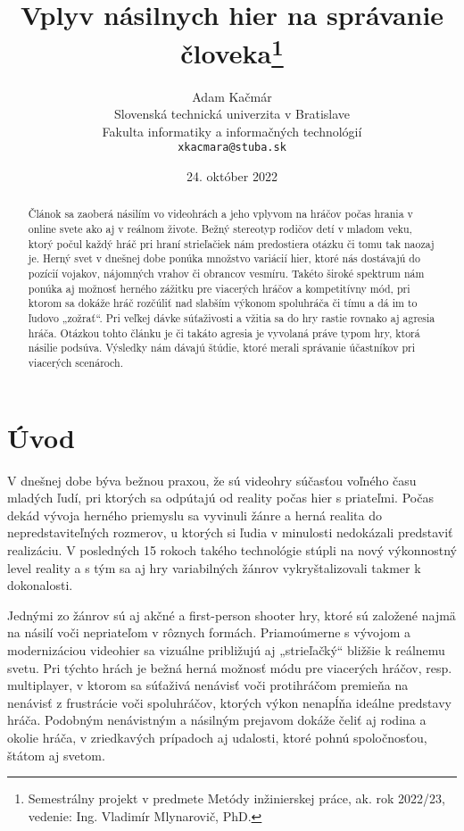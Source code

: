 \documentclass[10pt,twoside,slovak,a4paper]{article}
\title{Vplyv násilnych hier na správanie človeka\thanks{Semestrálny projekt v predmete Metódy inžinierskej práce, ak. rok 2022/23, vedenie: Ing. Vladimír Mlynarovič, PhD.}} %
\author{Adam Kačmár\\[2pt]
	{\small Slovenská technická univerzita v Bratislave}\\
	{\small Fakulta informatiky a informačných technológií}\\
	{\small \texttt{xkacmara@stuba.sk}}
	}
\date{\small 24. október 2022} %
\begin{document}
\maketitle

\begin{abstract}
Článok sa zaoberá násilím vo videohrách a jeho vplyvom na hráčov počas hrania v online svete ako aj v reálnom živote. Bežný stereotyp rodičov detí v mladom veku, ktorý počul každý hráč pri hraní strieľačiek nám predostiera otázku či tomu tak naozaj je. Herný svet v dnešnej dobe ponúka množstvo variácií hier, ktoré nás dostávajú do pozícií vojakov, nájomných vrahov či obrancov vesmíru. Takéto široké spektrum nám ponúka aj možnosť herného zážitku pre viacerých hráčov a kompetitívny mód, pri ktorom sa dokáže hráč rozčúliť nad slabším výkonom spoluhráča či tímu a dá im to ľudovo „zožrať“. Pri veľkej dávke súťaživosti a vžitia sa do hry rastie rovnako aj agresia hráča. Otázkou tohto článku je či takáto agresia je vyvolaná práve typom hry, ktorá násilie podsúva. Výsledky nám dávajú štúdie, ktoré merali správanie účastníkov pri viacerých scenároch.
\end{abstract}



\section{Úvod}

V dnešnej dobe býva bežnou praxou, že sú videohry súčasťou voľného času mladých ľudí, pri ktorých sa odpútajú od reality počas hier s priateľmi. Počas dekád vývoja herného priemyslu sa vyvinuli žánre a herná realita do nepredstaviteľných rozmerov, u ktorých si ľudia v minulosti nedokázali predstaviť realizáciu. V posledných 15 rokoch takého technológie stúpli na nový výkonnostný level reality a s tým sa aj hry variabilných žánrov vykryštalizovali takmer k dokonalosti.

Jednými zo žánrov sú aj akčné a first-person shooter hry, ktoré sú založené najmä na násilí voči nepriateľom v rôznych formách. Priamoúmerne s vývojom a modernizáciou videohier sa vizuálne približujú aj „strieľačký“ bližšie k reálnemu svetu. Pri týchto hrách je bežná herná možnosť módu pre viacerých hráčov, resp. multiplayer, v ktorom sa súťaživá nenávisť voči protihráčom premieňa na nenávisť z frustrácie voči spoluhráčov, ktorých výkon nenapĺňa ideálne predstavy hráča. Podobným nenávistným a násilným prejavom dokáže čeliť aj rodina a okolie hráča, v zriedkavých prípadoch aj udalosti, ktoré pohnú spoločnosťou, štátom aj svetom. 
\end{document}
